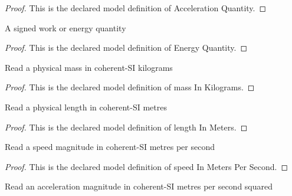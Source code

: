 \begin{proof}
  This is the declared model definition of Acceleration Quantity.
\end{proof}
\begin{definition}
  \label{def:physics:phyx-mini-0811:phyxminiproblems-problemphyxmini0811-energyquantity}
  A signed work or energy quantity
\end{definition}
\begin{proof}
  This is the declared model definition of Energy Quantity.
\end{proof}
\begin{definition}
  \label{def:physics:phyx-mini-0811:phyxminiproblems-problemphyxmini0811-massinkilograms}
  Read a physical mass in coherent-SI kilograms
\end{definition}
\begin{proof}
  This is the declared model definition of mass In Kilograms.
\end{proof}
\begin{definition}
  \label{def:physics:phyx-mini-0811:phyxminiproblems-problemphyxmini0811-lengthinmeters}
  Read a physical length in coherent-SI metres
\end{definition}
\begin{proof}
  This is the declared model definition of length In Meters.
\end{proof}
\begin{definition}
  \label{def:physics:phyx-mini-0811:phyxminiproblems-problemphyxmini0811-speedinmeterspersecond}
  Read a speed magnitude in coherent-SI metres per second
\end{definition}
\begin{proof}
  This is the declared model definition of speed In Meters Per Second.
\end{proof}
\begin{definition}
  \label{def:physics:phyx-mini-0811:phyxminiproblems-problemphyxmini0811-accelerationinmeterspersecondsquared}
  Read an acceleration magnitude in coherent-SI metres per second squared
\end{definition}

